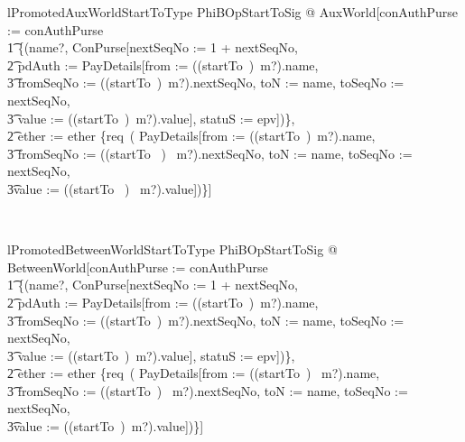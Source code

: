 \begin{LNewLemma}
\begin{theorem}{lPromotedAuxWorldStartToType}
    \forall PhiBOpStartToSig @ AuxWorld[conAuthPurse := conAuthPurse \\
        \t1 \oplus \{(name?, \theta ConPurse[nextSeqNo := 1 + nextSeqNo, \\
            \t2 pdAuth  := \theta PayDetails[from := ((startTo~\inv)~m?).name, \\
                    \t3 fromSeqNo := ((startTo~\inv)~m?).nextSeqNo, 
                    toN := name, toSeqNo := nextSeqNo, \\
                    \t3 value := ((startTo~\inv)~m?).value], statuS := epv])\}, \\
            \t2 ether := ether \cup \{req~( \theta PayDetails[from := ((startTo~\inv)~m?).name, \\
                    \t3 fromSeqNo := ((startTo~ \inv)~ m?).nextSeqNo, 
                    toN := name, toSeqNo := nextSeqNo, \\
                    \t3value := ((startTo~ \inv)~ m?).value])\}]
\end{theorem}~\end{LNewLemma}

\begin{LNewLemma}
\begin{theorem}{lPromotedBetweenWorldStartToType}
    \forall PhiBOpStartToSig @ BetweenWorld[conAuthPurse := conAuthPurse \\
        \t1 \oplus \{(name?, \theta ConPurse[nextSeqNo := 1 + nextSeqNo, \\
            \t2 pdAuth  := \theta PayDetails[from := ((startTo~\inv)~m?).name, \\
                    \t3 fromSeqNo := ((startTo~\inv)~m?).nextSeqNo, 
                    toN := name, toSeqNo := nextSeqNo, \\
                    \t3 value := ((startTo~\inv)~m?).value], statuS := epv])\}, \\
            \t2 ether := ether \cup \{req~( \theta PayDetails[from := ((startTo~\inv)~ m?).name, \\
                    \t3 fromSeqNo := ((startTo~\inv)~ m?).nextSeqNo, 
                    toN := name, toSeqNo := nextSeqNo, \\
                    \t3value := ((startTo~\inv)~m?).value])\}]
\end{theorem}~\end{LNewLemma}

